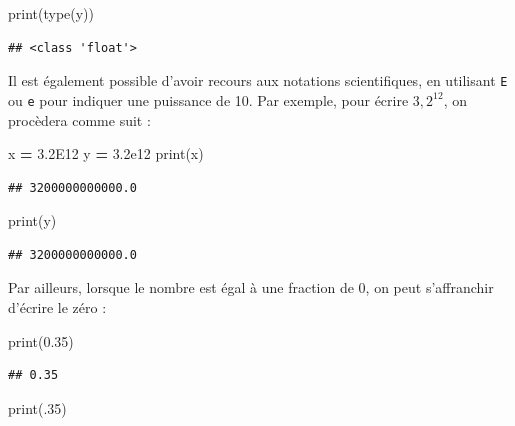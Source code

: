 \documentclass[12pt,]{book}
\newenvironment{Shaded}{\begin{snugshade}}{\end{snugshade}}
\newcommand{\DecValTok}[1]{\textcolor[rgb]{0.00,0.00,0.81}{#1}}
\newcommand{\FloatTok}[1]{\textcolor[rgb]{0.00,0.00,0.81}{#1}}
\newcommand{\OperatorTok}[1]{\textcolor[rgb]{0.81,0.36,0.00}{\textbf{#1}}}
\newcommand{\BuiltInTok}[1]{#1}
\newcommand{\NormalTok}[1]{#1}
\numberwithin{equation}{section}
\numberwithin{countremarque}{section}
\begin{document}
\begin{Shaded}
\begin{Highlighting}[]
\BuiltInTok{print}\NormalTok{(}\BuiltInTok{type}\NormalTok{(y))}
\end{Highlighting}
\end{Shaded}

\begin{lstlisting}
## <class 'float'>
\end{lstlisting}

Il est également possible d'avoir recours aux notations scientifiques,
en utilisant \texttt{E} ou \texttt{e} pour indiquer une puissance de 10.
Par exemple, pour écrire \(3,2^12\), on procèdera comme suit :

\begin{Shaded}
\begin{Highlighting}[]
\NormalTok{x }\OperatorTok{=} \FloatTok{3.2E12}
\NormalTok{y }\OperatorTok{=} \FloatTok{3.2e12}
\BuiltInTok{print}\NormalTok{(x)}
\end{Highlighting}
\end{Shaded}

\begin{lstlisting}
## 3200000000000.0
\end{lstlisting}

\begin{Shaded}
\begin{Highlighting}[]
\BuiltInTok{print}\NormalTok{(y)}
\end{Highlighting}
\end{Shaded}

\begin{lstlisting}
## 3200000000000.0
\end{lstlisting}

Par ailleurs, lorsque le nombre est égal à une fraction de 0, on peut
s'affranchir d'écrire le zéro :

\begin{Shaded}
\begin{Highlighting}[]
\BuiltInTok{print}\NormalTok{(}\FloatTok{0.35}\NormalTok{)}
\end{Highlighting}
\end{Shaded}

\begin{lstlisting}
## 0.35
\end{lstlisting}

\begin{Shaded}
\begin{Highlighting}[]
\BuiltInTok{print}\NormalTok{(.}\DecValTok{35}\NormalTok{)}
\end{Highlighting}
\end{Shaded}
\end{document}
